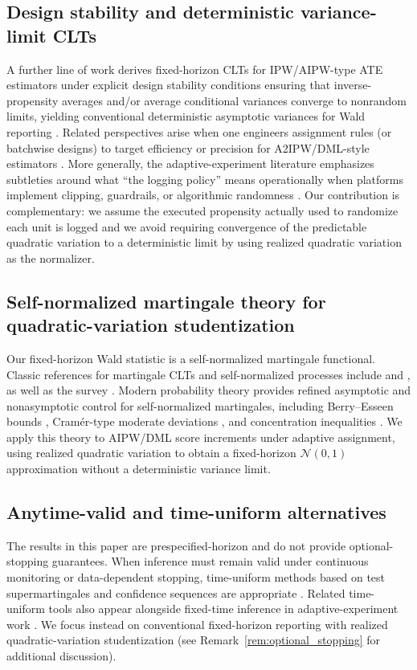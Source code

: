 \documentclass[11pt]{article}
\numberwithin{equation}{section}
\theoremstyle{plain}
\theoremstyle{definition}
\theoremstyle{remark}
\begin{document}
\subsection*{Design stability and deterministic variance-limit CLTs}
A further line of work derives fixed-horizon CLTs for IPW/AIPW-type ATE estimators under explicit design stability conditions ensuring that inverse-propensity averages and/or average conditional variances converge to nonrandom limits, yielding conventional deterministic asymptotic variances for Wald reporting \citep{sengupta2025designstability}. Related perspectives arise when one engineers assignment rules (or batchwise designs) to target efficiency or precision for A2IPW/DML-style estimators \citep{katoIshiharaHondaNarita2020,LiOwen2024,cook2024semiparametric}. More generally, the adaptive-experiment literature emphasizes subtleties around what ``the logging policy'' means operationally when platforms implement clipping, guardrails, or algorithmic randomness \citep{katoYasuiMcAlinn2021}. Our contribution is complementary: we assume the executed propensity actually used to randomize each unit is logged and we avoid requiring convergence of the predictable quadratic variation to a deterministic limit by using realized quadratic variation as the normalizer.

\subsection*{Self-normalized martingale theory for quadratic-variation studentization}
Our fixed-horizon Wald statistic is a self-normalized martingale functional. Classic references for martingale CLTs and self-normalized processes include \citet{hallHeyde1980} and \citet{delapena2009self}, as well as the survey \citet{shao2013survey}. Modern probability theory provides refined asymptotic and nonasymptotic control for self-normalized martingales, including Berry--Esseen bounds \citep{fanShao2018}, Cram{\'e}r-type moderate deviations \citep{fanGramaLiuShao2019}, and concentration inequalities \citep{bercuTouati2019}. We apply this theory to AIPW/DML score increments under adaptive assignment, using realized quadratic variation to obtain a fixed-horizon $\mathcal{N}(0,1)$ approximation without a deterministic variance limit.

\subsection*{Anytime-valid and time-uniform alternatives}
The results in this paper are prespecified-horizon and do not provide optional-stopping guarantees. When inference must remain valid under continuous monitoring or data-dependent stopping, time-uniform methods based on test supermartingales and confidence sequences are appropriate \citep{howard2021confidence,waudby2024timeuniform}. Related time-uniform tools also appear alongside fixed-time inference in adaptive-experiment work \citep{cook2024semiparametric,katoIshiharaHondaNarita2020,waudbySmithRamdas2024betting}. We focus instead on conventional fixed-horizon reporting with realized quadratic-variation studentization (see Remark~\ref{rem:optional_stopping} for additional discussion).
\end{document}
